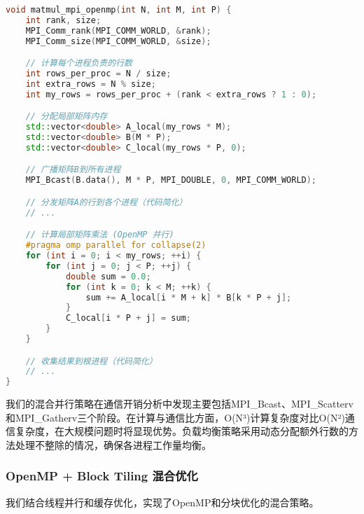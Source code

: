 \documentclass[12pt,a4paper]{article}
\begin{document}
\begin{lstlisting}[language=c++,caption=MPI + OpenMP混合并行实现]
void matmul_mpi_openmp(int N, int M, int P) {
    int rank, size;
    MPI_Comm_rank(MPI_COMM_WORLD, &rank);
    MPI_Comm_size(MPI_COMM_WORLD, &size);

    // 计算每个进程负责的行数
    int rows_per_proc = N / size;
    int extra_rows = N % size;
    int my_rows = rows_per_proc + (rank < extra_rows ? 1 : 0);

    // 分配局部矩阵内存
    std::vector<double> A_local(my_rows * M);
    std::vector<double> B(M * P);
    std::vector<double> C_local(my_rows * P, 0);

    // 广播矩阵B到所有进程
    MPI_Bcast(B.data(), M * P, MPI_DOUBLE, 0, MPI_COMM_WORLD);

    // 分发矩阵A的行到各个进程（代码简化）
    // ...

    // 计算局部矩阵乘法 (OpenMP 并行)
    #pragma omp parallel for collapse(2)
    for (int i = 0; i < my_rows; ++i) {
        for (int j = 0; j < P; ++j) {
            double sum = 0.0;
            for (int k = 0; k < M; ++k) {
                sum += A_local[i * M + k] * B[k * P + j];
            }
            C_local[i * P + j] = sum;
        }
    }

    // 收集结果到根进程（代码简化）
    // ...
}
\end{lstlisting}

我们的混合并行策略在通信开销分析中发现主要包括MPI\_Bcast、MPI\_Scatterv和MPI\_Gatherv三个阶段。在计算与通信比方面，O(N³)计算复杂度对比O(N²)通信复杂度，在大规模问题时将显现优势。负载均衡策略采用动态分配额外行数的方法处理不整除的情况，确保各进程工作量均衡。

\subsubsection{OpenMP + Block Tiling 混合优化}

我们结合线程并行和缓存优化，实现了OpenMP和分块优化的混合策略。
\end{document}
